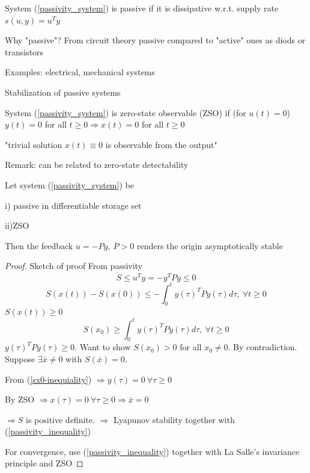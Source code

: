 \begin{Definition}
System (\ref{passivity_system}) is passive if it is dissipative w.r.t. supply rate $s(u,y) = u^Ty$
\end{Definition}

Why "passive"? From circuit theory passive compared to "active" ones as diods or transistors

Examples: electrical, mechanical systems

Stabilization of passive systems

\begin{Definition}
System (\ref{passivity_system}) is zero-state observable (ZSO) if (for $u(t)=0$) $y(t)=0$ for all $t \geq 0 \Rightarrow x(t) = 0$ for all $t \geq 0$

"trivial solution $x(t) \equiv 0$ is observable from the output" 
\end{Definition}

Remark: can be related to zero-state detectability

\begin{Theorem}
Let system (\ref{passivity_system}) be 

i) passive in differentiable storage set

ii)ZSO

Then the feedback $u=-Py, \ P > 0$ renders the origin asymptotically stable
\begin{proof}
Sketch of proof 
From passivity
\begin{equation}\label{passivity_inequality}
\dot{S} \leq u^Ty = -y^TPy \leq 0
\end{equation}
\begin{equation*}
S(x(t)) - S(x(0)) \leq - \int_0^ty(\tau)^TPy(\tau)d\tau , \ \forall t \geq 0
\end{equation*}
$S(x(t)) \geq 0$
\begin{equation}\label{sx0-inequiality}
S(x_0) \geq \int_0^ty(\tau)^TPy(\tau)d\tau, \ \forall t \geq 0
\end{equation}
$y(\tau)^TPy(\tau) \geq 0$. Want to show $S(x_0) > 0$ for all $x_0 \neq 0$. By contradiction. Suppose $\exists \bar{x} \neq 0$ with $S(\bar{x}) = 0$.

From (\ref{sx0-inequiality}) $\Rightarrow y(\tau) = 0 \ \forall \tau \geq 0$

By ZSO $\Rightarrow x(\tau) = 0 \ \forall \tau \geq 0 \Rightarrow \bar{x} = 0$

$\Rightarrow S$ is positive definite. $\Rightarrow$ Lyapunov stability together with (\ref{passivity_inequality})

For convergence, use (\ref{passivity_inequality}) together with La Salle's invariance principle and ZSO 
\end{proof}  
\end{Theorem}

